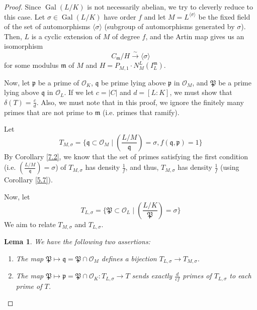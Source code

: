 \documentclass{article}
\DeclareMathOperator{\Gal}{Gal}
\theoremstyle{plain}
\newtheorem{lemma}[thm]{Lema}
\theoremstyle{definition}
\theoremstyle{remark}
\numberwithin{equation}{section}
\numberwithin{thm}{section}
\begin{document}
\begin{proof}
Since $\Gal(L/K)$ is not necessarily abelian, we try to cleverly reduce to this case. Let $\sigma \in \Gal(L/K)$ have order $f$ and let $M = L^{\langle\sigma\rangle}$ be the fixed field of the set of automorphisms $\langle\sigma\rangle$ (subgroup of automorphisms generated by $\sigma$). Then, $L$ is a cyclic extension of $M$ of degree $f$, and the Artin map gives us an isomorphism $$C_{\mathfrak{m}}/H \xrightarrow{\sim} \langle\sigma\rangle$$ for some modulus $\mathfrak{m}$ of $M$ and $H = P_{M, 1} \cdot N_{M}^{L}(I_{L}^{\mathfrak{m}})$. 

Now, let $\mathfrak{p}$ be a prime of $\mathcal{O}_K$, $\mathfrak{q}$ be prime lying above $\mathfrak{p}$ in $\mathcal{O}_M$, and $\mathfrak{P}$ be a prime lying above $\mathfrak{q}$ in $\mathcal{O}_L$. If we let $c = |C|$ and $d = [L : K]$, we must show that $\delta(T) = \frac{c}{d}$. Also, we must note that in this proof, we ignore the finitely many primes that are not prime to $\mathfrak{m}$ (i.e. primes that ramify). 

Let $$T_{M, \sigma} = \{\mathfrak{q} \subset \mathcal{O}_M \mid \left(\frac{L/M}{\mathfrak{q}}\right) = \sigma, f(\mathfrak{q}, \mathfrak{p}) = 1\}$$ By Corollary \ref{7.2}, we know that the set of primes satisfying the first condition (i.e. $\left(\frac{L/M}{\mathfrak{q}}\right) = \sigma$) of $T_{M, \sigma}$ has density $\frac{1}{f}$, and thus, $T_{M, \sigma}$ has density $\frac{1}{f}$ (using Corollary \ref{5.7}). 

Now, let $$T_{L, \sigma} = \{\mathfrak{P} \subset \mathcal{O}_L \mid \left(\frac{L/K}{\mathfrak{P}}\right) = \sigma\}$$ We aim to relate $T_{M, \sigma}$ and $T_{L, \sigma}$.

\begin{lemma}
We have the following two assertions:

\begin{enumerate}

    \item The map $\mathfrak{P} \mapsto \mathfrak{q} = \mathfrak{P} \cap \mathcal{O}_M$ defines a bijection $T_{L, \sigma} \to T_{M, \sigma}$. 
    
    \item The map $\mathfrak{P} \mapsto \mathfrak{p} = \mathfrak{P} \cap \mathcal{O}_K : T_{L, \sigma} \to T$ sends exactly $\frac{d}{cf}$ primes of $T_{L, \sigma}$ to each prime of $T$. 

\end{enumerate}


\end{lemma}
\end{proof}
\end{document}
